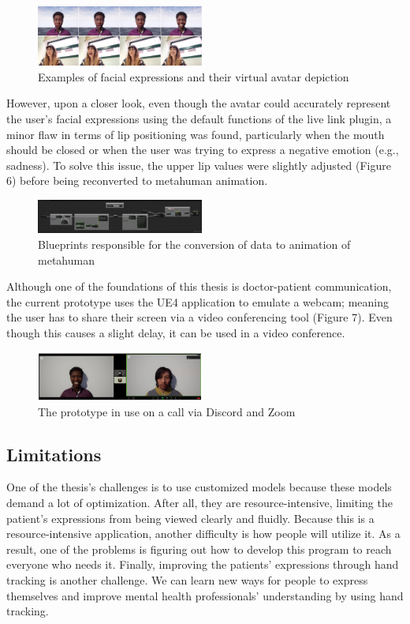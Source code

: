\begin{figure}[h!]
\includegraphics[width=0.49\textwidth]{figures/expressionTest.jpg}
\centering
\caption{Examples of facial expressions and their virtual avatar depiction}
\end{figure}

However, upon a closer look, even though the avatar could accurately represent the user's facial expressions using the default functions of the live link plugin, a minor flaw in terms of lip positioning was found, particularly when the mouth should be closed or when the user was trying to express a negative emotion (e.g., sadness). To solve this issue, the upper lip values were slightly adjusted (Figure 6) before being reconverted to metahuman animation.

\begin{figure}[h!]
\includegraphics[width=0.49\textwidth]{figures/facialConfig.png}
\centering
\caption{Blueprints responsible for the conversion of data to animation of metahuman}
\end{figure}

Although one of the foundations of this thesis is doctor-patient communication, the current prototype uses the UE4 application to emulate a webcam; meaning the user has to share their screen via a video conferencing tool (Figure 7). Even though this causes a slight delay, it can be used in a video conference.

\begin{figure}[h!]
\includegraphics[width=0.49\textwidth]{figures/zoomAndDiscord.PNG}
\centering
\caption{The prototype in use on a call via Discord and Zoom}
\end{figure}

\subsection{Limitations}
One of the thesis's challenges is to use customized models because these models demand a lot of optimization. After all, they are resource-intensive, limiting the patient's expressions from being viewed clearly and fluidly. Because this is a resource-intensive application, another difficulty is how people will utilize it. As a result, one of the problems is figuring out how to develop this program to reach everyone who needs it. Finally, improving the patients' expressions through hand tracking is another challenge. We can learn new ways for people to express themselves and improve mental health professionals' understanding by using hand tracking.

